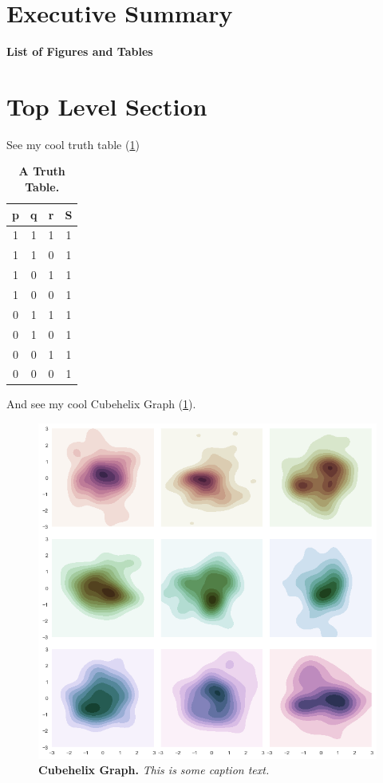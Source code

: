 \documentclass[12pt]{article}
\makeatletter
\newcommand \Dotfill {\leavevmode \cleaders \hb@xt@ .8em{\hss .\hss }\hfill \kern \z@}
\newcommand{\titlepagefigure}{Title Page Figure}
\newif\iftitlefigure
\makeatother
\begin{document}
\setcounter{page}{1}

\section{Executive Summary}
\blindtext

\clearpage
\tableofcontents
\clearpage

\begin{center}
{\fontsize{18pt}{24pt}\bfseries List of Figures and Tables}
\end{center}
\iftitlefigure
	{\hspace{6mm}\fontsize{14pt}{15pt}\hyperref[fig:titlepage]{Figure \thefigure. \titlepagefigure} \Dotfill Title Page}
\fi

\listoffigures
\listoftables
\clearpage

\setcounter{page}{1}

\section{Top Level Section}
\blindmathtrue
\blindtext

See my cool truth table (\ref{tab:truthy})

\begin{table} [h!]
\caption[Table \thetable. Truth Table]{ \textbf{A Truth Table.} } 
\begin{tabular} {c c c | c}
p & q & r & S\\ \hline
1 & 1 & 1 & 1\\
1 & 1 & 0 & 1\\
1 & 0 & 1 & 1\\
1 & 0 & 0 & 1\\
0 & 1 & 1 & 1\\
0 & 1 & 0 & 1\\
0 & 0 & 1 & 1\\
0 & 0 & 0 & 1\\
\end{tabular}
\label{tab:truthy}
\end{table}

\blindtext

And see my cool Cubehelix Graph (\ref{fig:cubehelix}).

\begin{figure}[!ht]
	\includegraphics[width=0.4\linewidth]{cubehelixpalette}
	\caption[Figure \thefigure. Cubehelix Graph]{ \textbf{Cubehelix Graph.} \textit{This is some caption text.}}
	\label{fig:cubehelix}
\end{figure}
\end{document}
